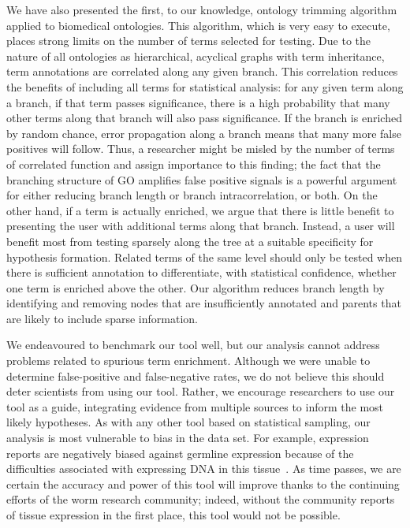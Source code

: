 \documentclass{bmcart}
\begin{document}
We have also presented the first, to our knowledge, ontology trimming algorithm applied to biomedical ontologies. This algorithm, which is very easy to execute, places strong limits on the number of terms selected for testing. Due to the nature of all ontologies as hierarchical, acyclical graphs with term inheritance, term annotations are correlated along any given branch. This correlation reduces the benefits of including all terms for statistical analysis: for any given term along a branch, if that term passes significance, there is a high probability that many other terms along that branch will also pass significance. If the branch is enriched by random chance, error propagation along a branch means that many more false positives will follow. Thus, a researcher might be misled by the number of terms of correlated function and assign importance to this finding; the fact that the branching structure of GO amplifies false positive signals is a powerful argument for either reducing branch length or branch intracorrelation, or both. On the other hand, if a term is actually enriched, we argue that there is little benefit to presenting the user with additional terms along that branch. Instead, a user will benefit most from testing sparsely along the tree at a suitable specificity for hypothesis formation. Related terms of the same level should only be tested when there is sufficient annotation to differentiate, with statistical confidence, whether one term is enriched above the other. Our algorithm reduces branch length by identifying and removing nodes that are insufficiently annotated and parents that are likely to include sparse information.


We endeavoured to benchmark our tool well, but our analysis cannot address problems related to spurious term enrichment. Although we were unable to determine false-positive and false-negative rates, we do not believe this should deter scientists from using our tool. Rather, we encourage researchers to use our tool as a guide, integrating evidence from multiple sources to inform the most likely hypotheses. As with any other tool based on statistical sampling, our analysis is most vulnerable to bias in the data set. For example, expression reports are negatively biased against germline expression because of the difficulties associated with expressing DNA in this tissue~\cite{Kelly1997}. As time passes, we are certain the accuracy and power of this tool will improve thanks to the continuing efforts of the  worm research community; indeed, without the community reports of tissue expression in the first place, this tool would not be possible.
\end{document}
